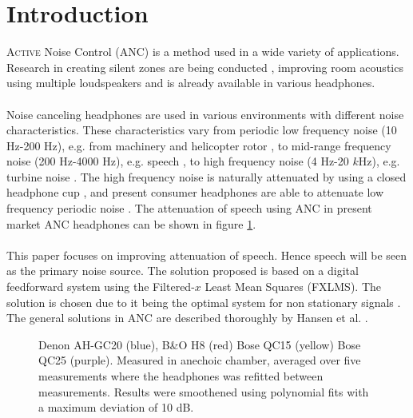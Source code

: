 \section*{Introduction}

\lettrine[lines=2]{A}{ctive} Noise Control 
(ANC) is a method used in a wide variety of applications. Research in creating silent zones are being conducted \cite{SilentZones}, improving room acoustics using multiple loudspeakers \cite{CAPS} and is already available in various headphones.
\\\\
Noise canceling headphones are used in various environments with different noise characteristics. These characteristics vary from periodic low frequency noise (10 Hz-200 Hz), e.g. from machinery and helicopter rotor \cite{LowFrequency}, to mid-range frequency noise (200 Hz-4000 Hz), e.g. speech \cite{MidFrequency}, to high frequency noise (4 Hz-20 $k$Hz), e.g. turbine noise \cite{LowFrequency}. The high frequency noise is naturally attenuated by using a closed headphone cup \cite{naturalAttenuation}, and present consumer headphones are able to attenuate low frequency periodic noise \cite{naturalAttenuation}. The attenuation of speech using ANC in present market ANC headphones can be shown in figure \ref{fig:ANCcompare}. \\\\


This paper focuses on improving attenuation of speech. Hence speech will be seen as the primary noise source. The solution proposed is based on a digital feedforward system using the Filtered-$x$ Least Mean Squares (FXLMS). The solution is chosen due to it being the optimal system for non stationary signals \cite{Hansen2}. The general solutions in ANC are described thoroughly by Hansen et al. \cite{Hansen}.

\begin{figure}[H]
	\centering
	
	\caption{Denon AH-GC20 (blue), B\&O H8 (red) Bose QC15 (yellow) Bose QC25 (purple). Measured in anechoic chamber, averaged over five measurements where the headphones was refitted between measurements. Results were smoothened using polynomial fits with a maximum deviation of 10 dB.}
	\label{fig:ANCcompare}
\end{figure}



